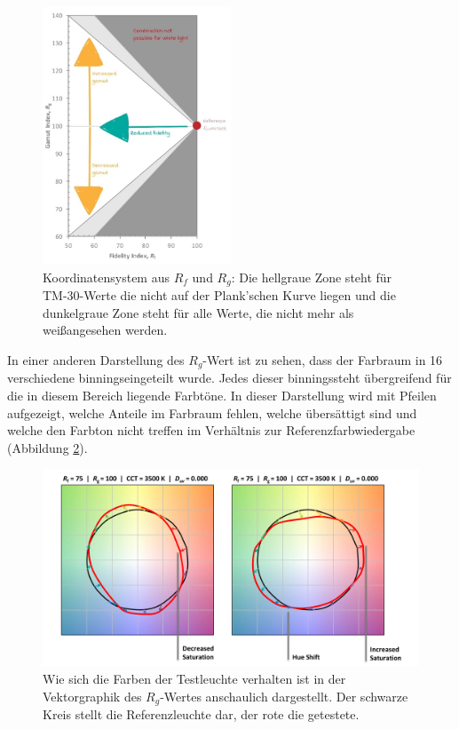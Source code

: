 \begin{figure}[H]     %
\centering
\includegraphics[width=0.5\textwidth]{bilder/tm302} 
\caption {Koordinatensystem aus $R_{f}$ und $R_{g}$: Die hellgraue Zone steht für TM-30-Werte die nicht auf der Plank'schen Kurve liegen und die dunkelgraue Zone steht für alle Werte, die nicht mehr als \glqq weiß\grqq angesehen werden. \protect\footnotemark}\label{b_tm302}
\end{figure}

In einer anderen Darstellung des $R_{g}$-Wert ist zu sehen, dass der Farbraum in 16 verschiedene \glqq binnings\grqq eingeteilt wurde. Jedes dieser \glqq binnings\grqq steht übergreifend für die in diesem Bereich liegende Farbtöne. In dieser Darstellung wird mit Pfeilen aufgezeigt, welche Anteile im Farbraum fehlen, welche übersättigt sind und welche den Farbton nicht treffen im Verhältnis zur Referenzfarbwiedergabe (Abbildung \ref{b_tm303}).

\begin{figure}[htp]     %
\centering
\includegraphics[width=1.0\textwidth]{bilder/tm303} 
\caption {Wie sich die Farben der Testleuchte verhalten ist in der Vektorgraphik des $R_{g}$-Wertes anschaulich dargestellt. Der schwarze Kreis stellt die Referenzleuchte dar, der rote die getestete.  \protect\footnotemark}\label{b_tm303}
\end{figure}

